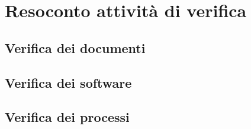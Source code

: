 \appendix
\section{Resoconto attività di verifica}\label{section:resoconto_verifica}
\subsection{Verifica dei documenti}\label{subsection:verifica_documenti}

\subsection{Verifica dei software}\label{subsection:verifica_software}

\subsection{Verifica dei processi}\label{subsection:verifica_processi}

